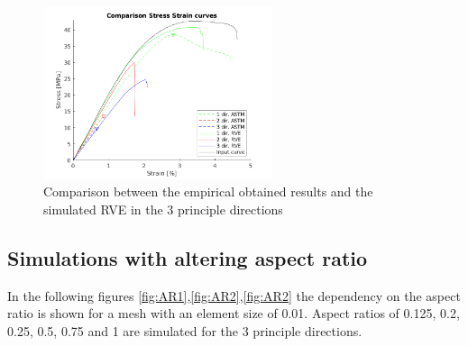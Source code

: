\begin{figure}[H]
    \centering
    \includegraphics[width=0.60\textwidth]{chapter_7_non-elasticmodelling/figures/ComparisonSS.png}
    \caption{Comparison between the empirical obtained results and the simulated RVE in the 3 principle directions}
    \label{fig:ComparisonSS}
\end{figure}

\subsection{Simulations with altering aspect ratio}
In the following figures \ref{fig:AR1},\ref{fig:AR2},\ref{fig:AR2} the dependency on the aspect ratio is shown for a mesh with an element size of 0.01. Aspect ratios of 0.125, 0.2, 0.25, 0.5, 0.75 and 1 are simulated for the 3 principle directions. 

